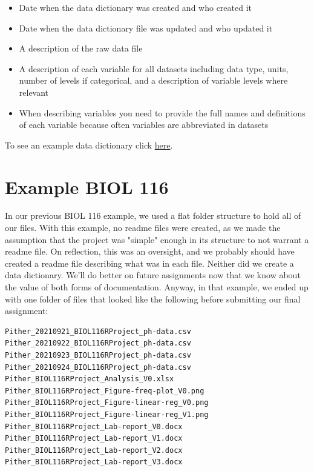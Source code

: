 \documentclass[
]{book}
\providecommand{\tightlist}{%
  \setlength{\itemsep}{0pt}\setlength{\parskip}{0pt}}
\begin{document}
\begin{itemize}
\tightlist
\item
  Date when the data dictionary was created and who created it
\item
  Date when the data dictionary file was updated and who updated it
\item
  A description of the raw data file
\item
  A description of each variable for all datasets including data type, units, number of levels if categorical, and a description of variable levels where relevant
\item
  When describing variables you need to provide the full names and definitions of each variable because often variables are abbreviated in datasets
\end{itemize}

To see an example data dictionary click \href{files/DS_DATA-DICTIONARY.md}{here}.

\hypertarget{example-biol-116}{%
\section{Example BIOL 116}\label{example-biol-116}}

In our previous BIOL 116 example, we used a flat folder structure to hold all of our files. With this example, no readme files were created, as we made the assumption that the project was "simple" enough in its structure to not warrant a readme file. On reflection, this was an oversight, and we probably should have created a readme file describing what was in each file. Neither did we create a data dictionary. We'll do better on future assignments now that we know about the value of both forms of documentation. Anyway, in that example, we ended up with one folder of files that looked like the following before submitting our final assignment:

\begin{verbatim}
Pither_20210921_BIOL116RProject_ph-data.csv
Pither_20210922_BIOL116RProject_ph-data.csv
Pither_20210923_BIOL116RProject_ph-data.csv
Pither_20210924_BIOL116RProject_ph-data.csv
Pither_BIOL116RProject_Analysis_V0.xlsx
Pither_BIOL116RProject_Figure-freq-plot_V0.png
Pither_BIOL116RProject_Figure-linear-reg_V0.png
Pither_BIOL116RProject_Figure-linear-reg_V1.png
Pither_BIOL116RProject_Lab-report_V0.docx
Pither_BIOL116RProject_Lab-report_V1.docx
Pither_BIOL116RProject_Lab-report_V2.docx
Pither_BIOL116RProject_Lab-report_V3.docx
\end{verbatim}
\end{document}
